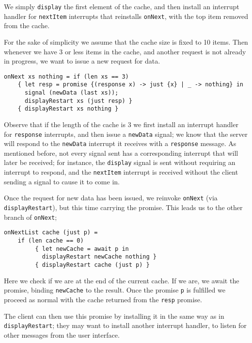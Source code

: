 \documentclass[msc,deptreport,cs]{infthesis} %
\newcommand{\code}[1]{\lstinline{#1}}
\begin{document}
\noindent We simply \code{display} the first element of the cache, and then
install an interrupt handler for \code{nextItem} interrupts that reinstalls
\code{onNext}, with the top item removed from the cache.

For the sake of simplicity we assume that the cache size is fixed to 10 items.
Then whenever we have 3 or less items in the cache, and another request is not
already in progress, we want to issue a new request for data.

\begin{lstlisting}
onNext xs nothing = if (len xs == 3)
    { let resp = promise {(response x) -> just {x} | _ -> nothing} in
      signal (newData (last xs));
      displayRestart xs (just resp) }
    { displayRestart xs nothing }
\end{lstlisting}

\noindent Observe that if the length of the cache is 3 we first install an
interrupt handler for \code{response} interrupts, and then issue a
\code{newData} signal; we know that the server will respond to the
\code{newData} interrupt it receives with a \code{response} message. As
mentioned before, not every signal sent has a corresponding interrupt that will
later be received; for instance, the \code{display} signal is sent without
requiring an interrupt to respond, and the \code{nextItem} interrupt is received
without the client sending a signal to cause it to come in.

Once the request for new data has been issued, we reinvoke \code{onNext} (via
\code{displayRestart}), but this time carrying the promise. This leads us to the
other branch of \code{onNext};

\begin{lstlisting}
onNextList cache (just p) =
    if (len cache == 0)
         { let newCache = await p in
           displayRestart newCache nothing }
         { displayRestart cache (just p) }
\end{lstlisting}

\noindent Here we check if we are at the end of the current cache. If we are, we
await the promise, binding \code{newCache} to the result. Once the promise
\code{p} is fulfilled we proceed as normal with the cache returned from the
\code{resp} promise.

The client can then use this promise by installing it in the same way as in
\code{displayRestart}; they may want to install another interrupt handler, to
listen for other messages from the user interface.
\end{document}
